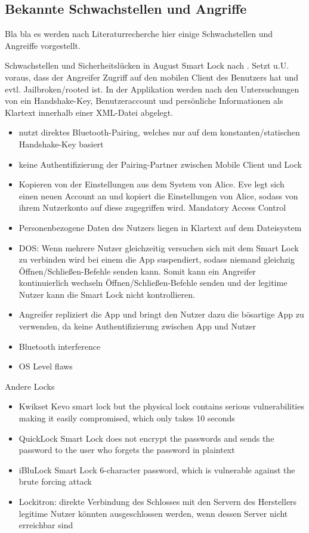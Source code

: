 \subsection{Bekannte Schwachstellen und Angriffe}
\label{sec:analysis_weaknesses}
    Bla bla es werden nach Literaturrecherche hier einige Schwachstellen und Angreiffe vorgestellt.
    
    Schwachstellen und Sicherheitslücken in August Smart Lock nach \citeauthor{Ye2017}.
	Setzt u.U. voraus, dass der Angreifer Zugriff auf den mobilen Client des Benutzers hat und evtl. Jailbroken/rooted ist.
	In der Applikation werden nach den Untersuchungen von \citeauthor{Ye2017} ein Handshake-Key, Benutzeraccount und persönliche Informationen als Klartext innerhalb einer XML-Datei abgelegt.
	\begin{itemize}
		\item nutzt direktes Bluetooth-Pairing, welches nur auf dem konstanten/statischen Handshake-Key basiert
		\item keine Authentifizierung der Pairing-Partner zwischen Mobile Client und Lock
		\item Kopieren von der Einstellungen aus dem System von Alice.
		    Eve legt sich einen neuen Account an und kopiert die Einstellungen von Alice, sodass von ihrem Nutzerkonto auf diese zugegriffen wird. \textrightarrow Mandatory Access Control
		\item Personenbezogene Daten des Nutzers liegen in Klartext auf dem Dateisystem
		\item DOS: Wenn mehrere Nutzer gleichzeitig versuchen sich mit dem Smart Lock zu verbinden wird bei einem die App suspendiert, sodass niemand gleichzig Öffnen/Schließen-Befehle senden kann.
		    Somit kann ein Angreifer kontinuierlich wechseln Öffnen/Schließen-Befehle senden und der legitime Nutzer kann die Smart Lock nicht kontrollieren.
	   \item Angreifer repliziert die App und bringt den Nutzer dazu die bösartige App zu verwenden, da keine Authentifizierung zwischen App und Nutzer
	   \item Bluetooth interference
	   \item OS Level flaws
	\end{itemize}

	Andere Locks
	\begin{itemize}
		\item Kwikset Kevo smart lock but the physical lock contains serious vulnerabilities making it easily compromised, which only takes 10 seconds\cite{Ye2017}
		\item QuickLock Smart Lock does not encrypt the passwords and sends the password to the user who forgets the password in plaintext\cite{Ye2017}
		\item iBluLock Smart Lock 6-character password, which is vulnerable against the brute forcing attack\cite{Ye2017}
		\item Lockitron: direkte Verbindung des Schlosses mit den Servern des Herstellers \textrightarrow legitime Nutzer könnten ausgeschlossen werden, wenn dessen Server nicht erreichbar sind
	\end{itemize}
	
